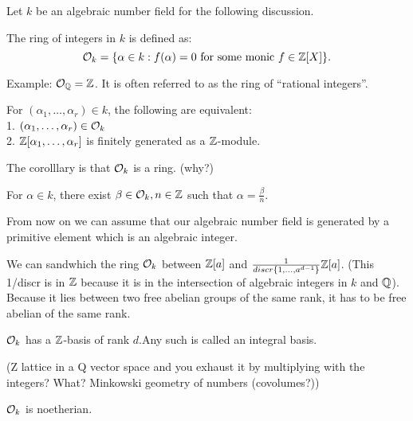 \begin{outline}
    \0 Let $k$ be an algebraic number field for the following discussion.
    \begin{definition}
        The ring of integers in $k$ is defined as:
        $$\mathcal{O}_k=\{\alpha \in k : f(\alpha)=0 \text{ for some monic }f\in \mathbb{Z}[X]\}.$$
    \end{definition}
        \1 Example: $\mathcal{O}_{\mathbb{Q}} = \mathbb{Z}$. It is often referred to as the ring of \enquote{rational integers}.
    \begin{proposition}
        For $(\alpha_1,\ldots,\alpha_r)\in k$, the following are equivalent:\\
        1. $(\alpha_1,\ldots,\alpha_r)\in\mathcal{O}_k$\\
        2. $\mathbb{Z}[\alpha_1,\ldots,\alpha_r]$ is finitely generated as a $\mathbb{Z}$-module.
    \end{proposition}
    The corolllary is that $\mathcal{O}_k$ is a ring. (why?)
    
    \begin{lemma}
        For $\alpha \in k$, there exist $\beta \in \mathcal{O}_k, n\in\mathbb{Z}$ such that $\alpha=\frac{\beta}{n}$.
    \end{lemma}
    
    From now on we can assume that our algebraic number field is generated by a primitive element which is an algebraic integer.
    
    \begin{proposition}
        We can sandwhich the ring $\mathcal{O}_k$ between $\mathbb{Z}[a]$ and $\frac{1}{discr\{1,\ldots,a^{d-1}\}} \mathbb{Z}[a]$. (This 1/discr is in $\mathbb{Z}$ because it is in the intersection of algebraic integers in $k$ and $\mathbb{Q}$). Because it lies between two free abelian groups of the same rank, it has to be free abelian of the same rank.
    \end{proposition}
    
    \begin{corollary}
        $\mathcal{O}_k$ has a $\mathbb{Z}$-basis of rank $d$.Any such is called an integral basis.
    \end{corollary}
    (Z lattice in a Q vector space and you exhaust it by multiplying with the integers? What? Minkowski geometry of numbers (covolumes?))
    
    \begin{corollary}
        $\mathcal{O}_k$ is noetherian. 
    \end{corollary}
    

\end{outline}
